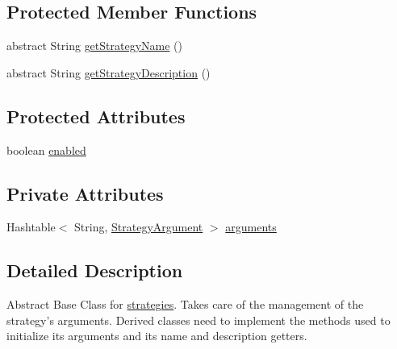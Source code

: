 \subsection*{Protected Member Functions}
\begin{DoxyCompactItemize}
\item 
abstract String \hyperlink{classch_1_1zhaw_1_1ba10__bsha__1_1_1strategies_1_1BaseStrategy_aa0ebed55eed45409bad13d43a0058780}{getStrategyName} ()
\item 
abstract String \hyperlink{classch_1_1zhaw_1_1ba10__bsha__1_1_1strategies_1_1BaseStrategy_a75fdb36932ad701f6375cc1fe718056b}{getStrategyDescription} ()
\end{DoxyCompactItemize}
\subsection*{Protected Attributes}
\begin{DoxyCompactItemize}
\item 
boolean \hyperlink{classch_1_1zhaw_1_1ba10__bsha__1_1_1strategies_1_1BaseStrategy_a5799e7f094efcf8d18d8788e9c911787}{enabled}
\end{DoxyCompactItemize}
\subsection*{Private Attributes}
\begin{DoxyCompactItemize}
\item 
Hashtable$<$ String, \hyperlink{classch_1_1zhaw_1_1ba10__bsha__1_1_1StrategyArgument}{StrategyArgument} $>$ \hyperlink{classch_1_1zhaw_1_1ba10__bsha__1_1_1strategies_1_1BaseStrategy_ac15d972a209d299069ce7d7940e9322e}{arguments}
\end{DoxyCompactItemize}


\subsection{Detailed Description}
Abstract Base Class for \hyperlink{namespacech_1_1zhaw_1_1ba10__bsha__1_1_1strategies}{strategies}. Takes care of the management of the strategy's arguments. Derived classes need to implement the methods used to initialize its arguments and its name and description getters.

